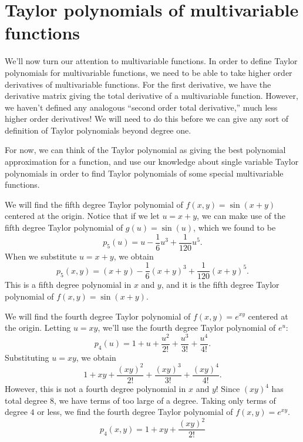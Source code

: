 \documentclass{ximera}
\begin{document}
\section*{Taylor polynomials of multivariable functions}

We'll now turn our attention to multivariable functions. In order to define Taylor polynomials for multivariable functions, we need to be able to take higher order derivatives of multivariable functions. For the first derivative, we have the derivative matrix giving the total derivative of a multivariable function. However, we haven't defined any analogous ``second order total derivative,'' much less higher order derivatives! We will need to do this before we can give any sort of definition of Taylor polynomials beyond degree one.

For now, we can think of the Taylor polynomial as giving the best polynomial approximation for a function, and use our knowledge about single variable Taylor polynomials in order to find Taylor polynomials of some special multivariable functions.

\begin{example}
We will find the fifth degree Taylor polynomial of $f(x,y) = \sin (x+y)$ centered at the origin. Notice that if we let $u=x+y$, we can make use of the fifth degree Taylor polynomial of $g(u) = \sin(u)$, which we found to be
\[
p_5(u) = u-\frac{1}{6}u^3+\frac{1}{120}u^5.
\]
When we substitute $u = x+y$, we obtain
\[
p_5(x,y) = (x+y)-\frac{1}{6}(x+y)^3+\frac{1}{120}(x+y)^5.
\]
This is a fifth degree polynomial in $x$ and $y$, and it is the fifth degree Taylor polynomial of $f(x,y) = \sin(x+y)$.
\end{example}

\begin{example}
We will find the fourth degree Taylor polynomial of $f(x,y) = e^{xy}$ centered at the origin. Letting $u=xy$, we'll use the fourth degree Taylor polynomial of $e^u$:
\[
p_4(u) = 1 + u + \frac{u^2}{2!} +\frac{u^3}{3!} + \frac{u^4}{4!}.
\]
Substituting $u=xy$, we obtain
\[
1 + xy + \frac{(xy)^2}{2!} +\frac{(xy)^3}{3!} + \frac{(xy)^4}{4!}.
\]
However, this is not a fourth degree polynomial in $x$ and $y$! Since $(xy)^4$ has total degree $8$, we have terms of too large of a degree. Taking only terms of degree $4$ or less, we find the fourth degree Taylor polynomial of $f(x,y) = e^{xy}$.
\[
p_4(x,y) = 1 + xy + \frac{(xy)^2}{2!}
\]
\end{example}
\end{document}
